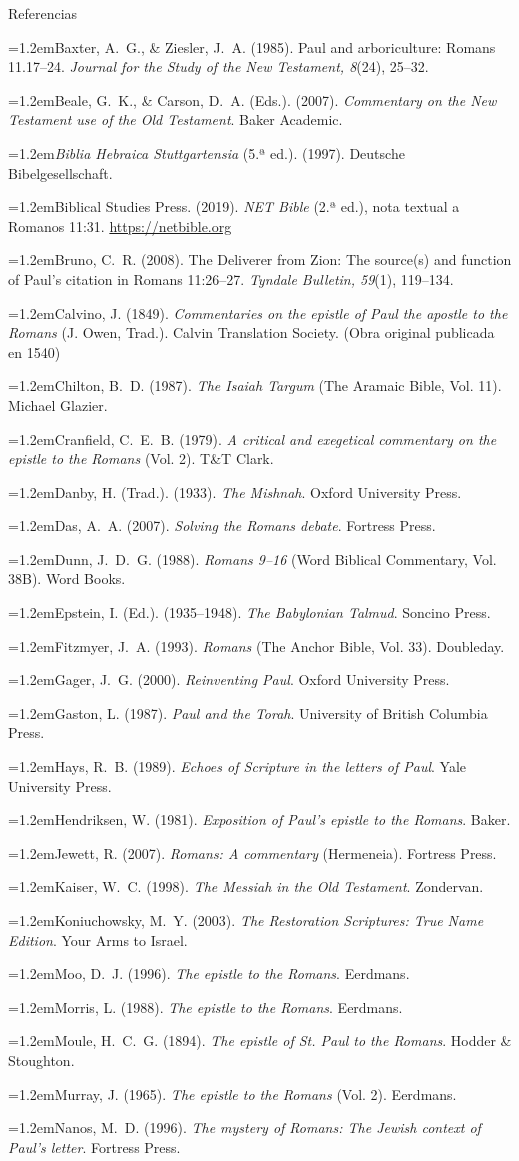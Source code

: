 \documentclass[hyperref={bookmarks=false},aspectratio=169]{beamer}
\newcommand{\refapa}[1]{\par\hangindent=1.2em\hangafter=1\noindent #1\par\vspace{3pt}}
\begin{document}
\begin{frame}[allowframebreaks]{Referencias}
\tiny
\refapa{Baxter, A.~G., \& Ziesler, J.~A. (1985). Paul and arboriculture: Romans 11.17--24. \emph{Journal for the Study of the New Testament, 8}(24), 25--32.}
\refapa{Beale, G.~K., \& Carson, D.~A. (Eds.). (2007). \emph{Commentary on the New Testament use of the Old Testament}. Baker Academic.}
\refapa{\emph{Biblia Hebraica Stuttgartensia} (5.ª ed.). (1997). Deutsche Bibelgesellschaft.}
\refapa{Biblical Studies Press. (2019). \emph{NET Bible} (2.ª ed.), nota textual a Romanos 11:31. \url{https://netbible.org}}
\refapa{Bruno, C.~R. (2008). The Deliverer from Zion: The source(s) and function of Paul's citation in Romans 11:26--27. \emph{Tyndale Bulletin, 59}(1), 119--134.}
\refapa{Calvino, J. (1849). \emph{Commentaries on the epistle of Paul the apostle to the Romans} (J. Owen, Trad.). Calvin Translation Society. (Obra original publicada en 1540)}
\refapa{Chilton, B.~D. (1987). \emph{The Isaiah Targum} (The Aramaic Bible, Vol. 11). Michael Glazier.}
\refapa{Cranfield, C.~E.~B. (1979). \emph{A critical and exegetical commentary on the epistle to the Romans} (Vol. 2). T\&T Clark.}
\refapa{Danby, H. (Trad.). (1933). \emph{The Mishnah}. Oxford University Press.}
\refapa{Das, A.~A. (2007). \emph{Solving the Romans debate}. Fortress Press.}
\refapa{Dunn, J.~D.~G. (1988). \emph{Romans 9--16} (Word Biblical Commentary, Vol. 38B). Word Books.}
\refapa{Epstein, I. (Ed.). (1935--1948). \emph{The Babylonian Talmud}. Soncino Press.}
\refapa{Fitzmyer, J.~A. (1993). \emph{Romans} (The Anchor Bible, Vol. 33). Doubleday.}
\refapa{Gager, J.~G. (2000). \emph{Reinventing Paul}. Oxford University Press.}
\refapa{Gaston, L. (1987). \emph{Paul and the Torah}. University of British Columbia Press.}
\refapa{Hays, R.~B. (1989). \emph{Echoes of Scripture in the letters of Paul}. Yale University Press.}
\refapa{Hendriksen, W. (1981). \emph{Exposition of Paul's epistle to the Romans}. Baker.}
\refapa{Jewett, R. (2007). \emph{Romans: A commentary} (Hermeneia). Fortress Press.}
\refapa{Kaiser, W.~C. (1998). \emph{The Messiah in the Old Testament}. Zondervan.}
\refapa{Koniuchowsky, M.~Y. (2003). \emph{The Restoration Scriptures: True Name Edition}. Your Arms to Israel.}
\refapa{Moo, D.~J. (1996). \emph{The epistle to the Romans}. Eerdmans.}
\refapa{Morris, L. (1988). \emph{The epistle to the Romans}. Eerdmans.}
\refapa{Moule, H.~C.~G. (1894). \emph{The epistle of St. Paul to the Romans}. Hodder \& Stoughton.}
\refapa{Murray, J. (1965). \emph{The epistle to the Romans} (Vol. 2). Eerdmans.}
\refapa{Nanos, M.~D. (1996). \emph{The mystery of Romans: The Jewish context of Paul's letter}. Fortress Press.}

\end{frame}
\end{document}
